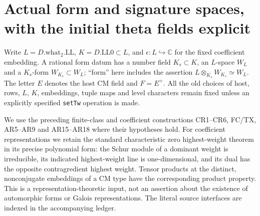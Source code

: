 \section{Actual form and signature spaces, with the initial theta fields explicit}
\label{sec:automorphic-realization}


Write $L=D.\mathrm{what}_2.\mathrm{LL}$, $K=D.\mathrm{LL0}\subset L$,
and $\epsilon:L\hookrightarrow\mathbb C$ for the fixed coefficient
embedding. A rational form datum has a number field $K_s\subset K$,
an $L$-space $W_L$ and a $K_s$-form $W_{K_s}\subset W_L$; ``form'' here
includes the assertion $L\otimes_{K_s}W_{K_s}\simeq W_L$.
The letter $E$ denotes the host CM field and $F=E^+$.
All the old choices of host, rows, $L$, $K$, embeddings, tuple maps and
level characters remain fixed unless an explicitly specified
\texttt{setTw} operation is made.

We use the preceding finite-class and coefficient constructions
CR1--CR6, FC/TX, AR5--AR9 and AR15--AR18 where their hypotheses hold.
For coefficient representations we retain the standard characteristic
zero highest-weight theorem in its precise polynomial form: the
Schur module of a dominant weight is irreducible, its indicated
highest-weight line is one-dimensional, and its dual has the opposite
contragredient highest weight. Tensor products at the distinct,
nonconjugate embeddings of a CM type have the corresponding product
property. This is a representation-theoretic input, not an assertion
about the existence of automorphic forms or Galois representations.
The literal source interfaces are indexed in the accompanying ledger.

